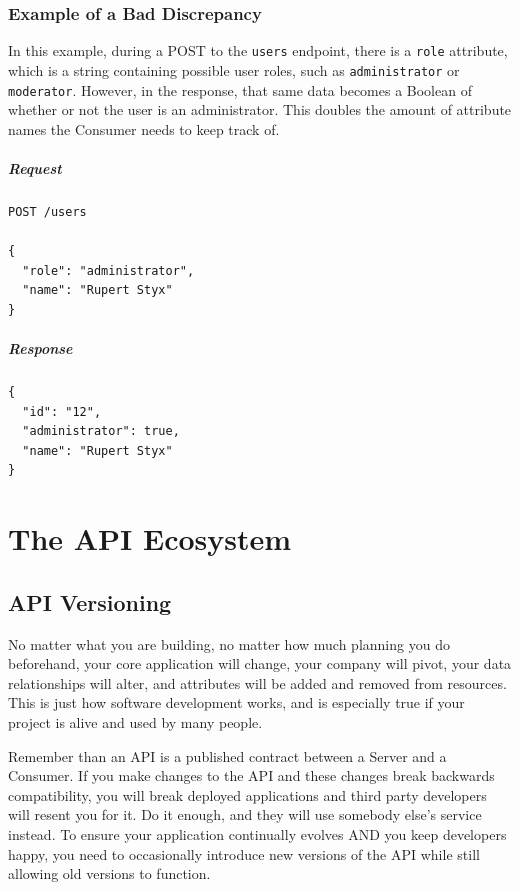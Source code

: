 \documentclass{book}
\begin{document}
\subsection{Example of a Bad Discrepancy}

In this example, during a POST to the \texttt{users} endpoint, there is a \texttt{role} attribute, which is a string containing possible user roles, such as \texttt{administrator} or \texttt{moderator}. However, in the response, that same data becomes a Boolean of whether or not the user is an administrator. This doubles the amount of attribute names the Consumer needs to keep track of.

\paragraph{\textbf{Request}}

\begin{verbatim}
POST /users

{
  "role": "administrator",
  "name": "Rupert Styx"
}
\end{verbatim}

\paragraph{\textbf{Response}}

\begin{verbatim}
{
  "id": "12",
  "administrator": true,
  "name": "Rupert Styx"
}
\end{verbatim}


\chapter{The API Ecosystem}

\section{API Versioning}

No matter what you are building, no matter how much planning you do beforehand, your core application will change, your company will pivot, your data relationships will alter, and attributes will be added and removed from resources. This is just how software development works, and is especially true if your project is alive and used by many people.

Remember than an API is a published contract between a Server and a Consumer. If you make changes to the API and these changes break backwards compatibility, you will break deployed applications and third party developers will resent you for it. Do it enough, and they will use somebody else's service instead. To ensure your application continually evolves AND you keep developers happy, you need to occasionally introduce new versions of the API while still allowing old versions to function.
\end{document}
